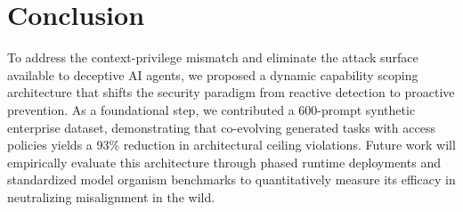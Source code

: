 \documentclass{article}
\theoremstyle{plain}
\theoremstyle{definition}
\theoremstyle{remark}
\begin{document}
\section{Conclusion}

To address the context-privilege mismatch and eliminate the attack surface available to deceptive AI agents, we proposed a dynamic capability scoping architecture that shifts the security paradigm from reactive detection to proactive prevention. As a foundational step, we contributed a 600-prompt synthetic enterprise dataset, demonstrating that co-evolving generated tasks with access policies yields a 93\% reduction in architectural ceiling violations. Future work will empirically evaluate this architecture through phased runtime deployments and standardized model organism benchmarks to quantitatively measure its efficacy in neutralizing misalignment in the wild.



\end{document}
